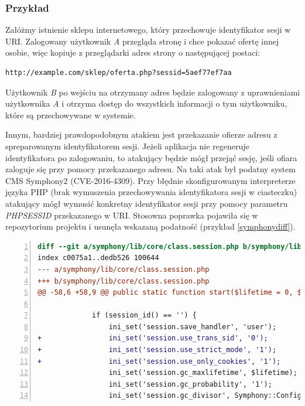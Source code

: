 \documentclass[11pt,a4paper,polish,thesis]{dcsbook}
\begin{document}
\subsubsection*{Przykład}
Załóżmy istnienie sklepu internetowego, który przechowuje identyfikator sesji w URI. Zalogowany użytkownik \textit{A} przegląda stronę i chce pokazać ofertę innej osobie, więc kopiuje z przeglądarki adres strony o następującej postaci:
\begin{lstlisting}
http://example.com/sklep/oferta.php?sessid=5aef77ef7aa
\end{lstlisting}
Użytkownik \textit{B} po wejściu na otrzymany adres będzie zalogowany z uprawnieniami użytkownika \textit{A} i otrzyma dostęp do wszystkich informacji o tym użytkowniku, które są przechowywane w systemie.

Innym, bardziej prawdopodobnym atakiem jest przekazanie ofierze adresu z spreparowanym identyfikatorem sesji. Jeżeli aplikacja nie regeneruje identyfikatora po zalogowaniu, to atakujący będzie mógł przejąć sesję, jeśli ofiara zaloguje się przy pomocy przekazanego adresu. Na taki atak był podatny system CMS Symphony2 (CVE-2016-4309). Przy błędnie skonfigurowanym interpreterze języka PHP (brak wymuszenia przechowywania identyfikatora sesji w ciasteczku) atakujący mógł wymusić konkretny identyfikator sesji przy pomocy parametru \textit{PHPSESSID} przekazanego w URI. Stosowna poprawka pojawiła się w repozytorium projektu i usunęła wskazaną podatność (przykład \ref{symphonydiff}).

\begin{lstlisting}[language=diff,frame=single,caption=łatka naprawiająca podatność fiksacji sesji w Symphony2 \cite{symphony},label=symphonydiff,numbers=left]
diff --git a/symphony/lib/core/class.session.php b/symphony/lib/core/class.session.php
index c0075a1..dedb526 100644
--- a/symphony/lib/core/class.session.php
+++ b/symphony/lib/core/class.session.php
@@ -58,6 +58,9 @@ public static function start($lifetime = 0, $path = '/', $domain = null, $httpOn
 
             if (session_id() == '') {
                 ini_set('session.save_handler', 'user');
+                ini_set('session.use_trans_sid', '0');
+                ini_set('session.use_strict_mode', '1');
+                ini_set('session.use_only_cookies', '1');
                 ini_set('session.gc_maxlifetime', $lifetime);
                 ini_set('session.gc_probability', '1');
                 ini_set('session.gc_divisor', Symphony::Configuration()->get('session_gc_divisor', 'symphony'));
\end{lstlisting}
\end{document}
